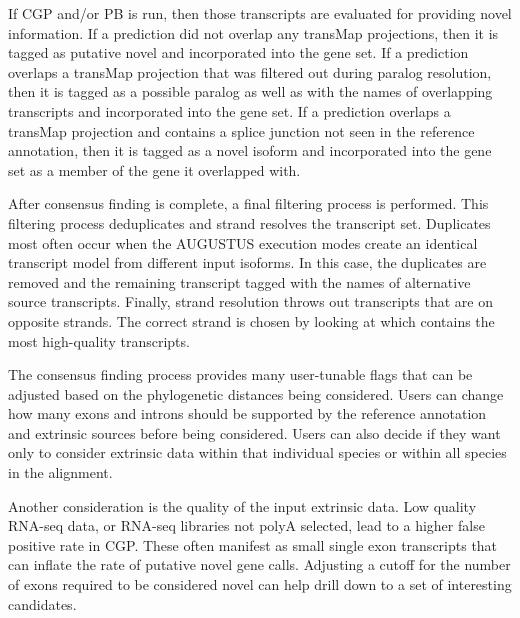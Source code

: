 \documentclass[fleqn,10pt]{wlscirep}
\begin{document}
	If CGP and/or PB is run, then those transcripts are evaluated for providing novel information. If a prediction did not overlap any transMap projections, then it is tagged as putative novel and incorporated into the gene set. If a prediction overlaps a transMap projection that was filtered out during paralog resolution, then it is tagged as a possible paralog as well as with the names of overlapping transcripts and incorporated into the gene set. If a prediction overlaps a transMap projection and contains a splice junction not seen in the reference annotation, then it is tagged as a novel isoform and incorporated into the gene set as a member of the gene it overlapped with.
  
	After consensus finding is complete, a final filtering process is performed. This filtering process deduplicates and strand resolves the transcript set. Duplicates most often occur when the AUGUSTUS execution modes create an identical transcript model from different input isoforms. In this case, the duplicates are removed and the remaining transcript tagged with the names of alternative source transcripts. Finally, strand resolution throws out transcripts that are on opposite strands. The correct strand is chosen by looking at which contains the most high-quality transcripts.
  
	The consensus finding process provides many user-tunable flags that can be adjusted based on the phylogenetic distances being considered. Users can change how many exons and introns should be supported by the reference annotation and extrinsic sources before being considered. Users can also decide if they want only to consider extrinsic data within that individual species or within all species in the alignment. 

Another consideration is the quality of the input extrinsic data. Low quality RNA-seq data, or RNA-seq libraries not polyA selected, lead to a higher false positive rate in CGP. These often manifest as small single exon transcripts that can inflate the rate of putative novel gene calls. Adjusting a cutoff for the number of exons required to be considered novel can help drill down to a set of interesting candidates.
\end{document}
